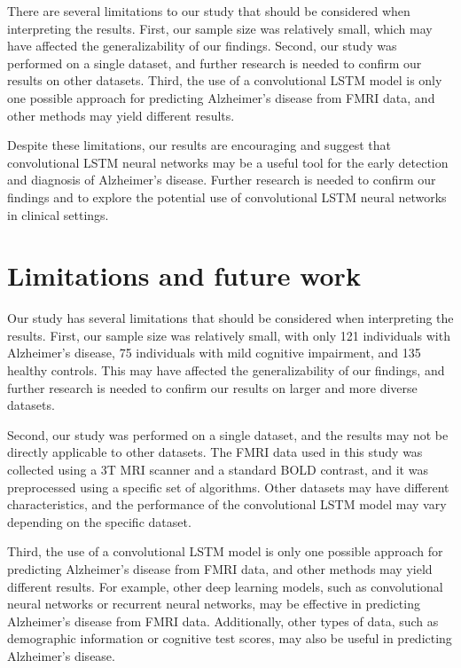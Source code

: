 \documentclass[10pt]{article}
\begin{document}
	There are several limitations to our study that should be considered when interpreting the results. First, our sample size was relatively small, which may have affected the generalizability of our findings. Second, our study was performed on a single dataset, and further research is needed to confirm our results on other datasets. Third, the use of a convolutional LSTM model is only one possible approach for predicting Alzheimer's disease from FMRI data, and other methods may yield different results.

	Despite these limitations, our results are encouraging and suggest that convolutional LSTM neural networks may be a useful tool for the early detection and diagnosis of Alzheimer's disease. Further research is needed to confirm our findings and to explore the potential use of convolutional LSTM neural networks in clinical settings.

	\section{Limitations and future work}

	Our study has several limitations that should be considered when interpreting the results. First, our sample size was relatively small, with only 121 individuals with Alzheimer's disease, 75 individuals with mild cognitive impairment, and 135 healthy controls. This may have affected the generalizability of our findings, and further research is needed to confirm our results on larger and more diverse datasets.

	Second, our study was performed on a single dataset, and the results may not be directly applicable to other datasets. The FMRI data used in this study was collected using a 3T MRI scanner and a standard BOLD contrast, and it was preprocessed using a specific set of algorithms. Other datasets may have different characteristics, and the performance of the convolutional LSTM model may vary depending on the specific dataset.

	Third, the use of a convolutional LSTM model is only one possible approach for predicting Alzheimer's disease from FMRI data, and other methods may yield different results. For example, other deep learning models, such as convolutional neural networks or recurrent neural networks, may be effective in predicting Alzheimer's disease from FMRI data. Additionally, other types of data, such as demographic information or cognitive test scores, may also be useful in predicting Alzheimer's disease.
\end{document}
